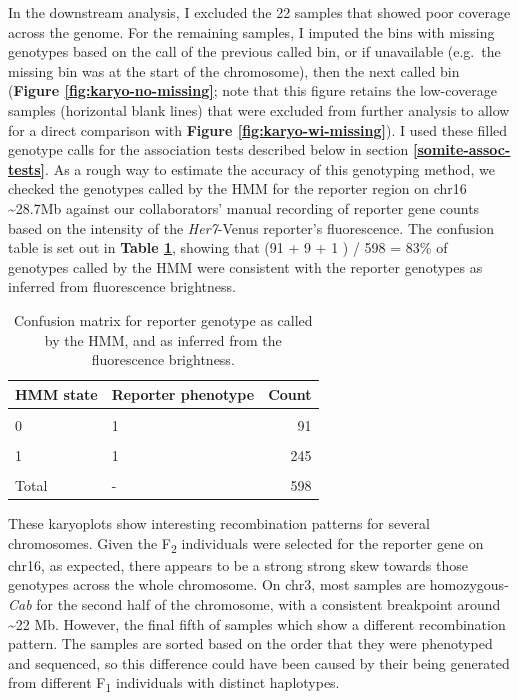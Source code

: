 \documentclass[
]{book}
\begin{document}
In the downstream analysis, I excluded the 22 samples that showed poor coverage across the genome. For the remaining samples, I imputed the bins with missing genotypes based on the call of the previous called bin, or if unavailable (e.g.~the missing bin was at the start of the chromosome), then the next called bin (\textbf{Figure \ref{fig:karyo-no-missing}}; note that this figure retains the low-coverage samples (horizontal blank lines) that were excluded from further analysis to allow for a direct comparison with \textbf{Figure \ref{fig:karyo-wi-missing}}). I used these filled genotype calls for the association tests described below in section \textbf{\ref{somite-assoc-tests}}. As a rough way to estimate the accuracy of this genotyping method, we checked the genotypes called by the HMM for the reporter region on chr16 \textasciitilde28.7Mb against our collaborators' manual recording of reporter gene counts based on the intensity of the \emph{Her7}-Venus reporter's fluorescence. The confusion table is set out in \textbf{Table \ref{tab:reporter-conc-tbl}}, showing that (91 + 9 + 1 ) / 598 = 83\% of genotypes called by the HMM were consistent with the reporter genotypes as inferred from fluorescence brightness.

\begin{table}

\caption{\label{tab:reporter-conc-tbl}Confusion matrix for reporter genotype as called by the HMM, and as inferred from the fluorescence brightness.}
\centering
\begin{tabular}[t]{llr}
\toprule
HMM state & Reporter phenotype & Count\\
\midrule
\cellcolor{gray!6}{0} & \cellcolor{gray!6}{0} & \cellcolor{gray!6}{252}\\
0 & 1 & 91\\
\cellcolor{gray!6}{1} & \cellcolor{gray!6}{0} & \cellcolor{gray!6}{9}\\
1 & 1 & 245\\
\cellcolor{gray!6}{2} & \cellcolor{gray!6}{1} & \cellcolor{gray!6}{1}\\
\addlinespace
Total & - & 598\\
\bottomrule
\end{tabular}
\end{table}

These karyoplots show interesting recombination patterns for several chromosomes. Given the F\textsubscript{2} individuals were selected for the reporter gene on chr16, as expected, there appears to be a strong strong skew towards those genotypes across the whole chromosome. On chr3, most samples are homozygous-\emph{Cab} for the second half of the chromosome, with a consistent breakpoint around \textasciitilde22 Mb. However, the final fifth of samples which show a different recombination pattern. The samples are sorted based on the order that they were phenotyped and sequenced, so this difference could have been caused by their being generated from different F\textsubscript{1} individuals with distinct haplotypes.
\end{document}
